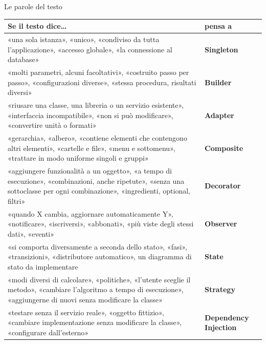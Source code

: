 \begin{guida}{Le parole del testo}
\centering
\renewcommand{\arraystretch}{1.3}
\begin{tabular}{@{}P{12.4cm} >{\bfseries}l@{}}
  \textbf{Se il testo dice\ldots} & \textbf{\normalfont pensa a} \\ \hline
  «una sola istanza», «unico», «condiviso da tutta l'applicazione», «accesso globale», «la connessione al database»
    & Singleton \\
  «molti parametri, alcuni facoltativi», «costruito passo per passo», «configurazioni diverse», «stessa procedura,
    risultati diversi» & Builder \\
  «riusare una classe, una libreria o un servizio esistente», «interfaccia incompatibile», «non si può modificare»,
    «convertire unità o formati» & Adapter \\
  «gerarchia», «albero», «contiene elementi che contengono altri elementi», «cartelle e file», «menu e
    sottomenu», «trattare in modo uniforme singoli e gruppi» & Composite \\
  «aggiungere funzionalità a un oggetto», «a tempo di esecuzione», «combinazioni, anche ripetute», «senza una
    sottoclasse per ogni combinazione», «ingredienti, optional, filtri» & Decorator \\
  «quando X cambia, aggiornare automaticamente Y», «notificare», «iscriversi», «abbonati», «più viste degli stessi
    dati», «eventi» & Observer \\
  «si comporta diversamente a seconda dello stato», «fasi», «transizioni», «distributore automatico», un diagramma
    di stato da implementare & State \\
  «modi diversi di calcolare», «politiche», «l'utente sceglie il metodo», «cambiare l'algoritmo a tempo di
    esecuzione», «aggiungerne di nuovi senza modificare la classe» & Strategy \\
  «testare senza il servizio reale», «oggetto fittizio», «cambiare implementazione senza modificare la classe»,
    «configurare dall'esterno» & Dependency Injection \\
\end{tabular}
\end{guida}


